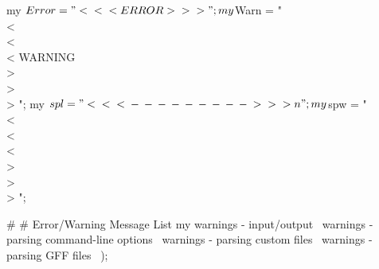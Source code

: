 \documentclass[11pt]{article}
\def\nwendcode{\endtrivlist \endgroup} %
\let\nwdocspar=\par                    %
\begin{document}

\nwenddocs{}\plusendmoddef
my $Error = "\\<\\<\\<  ERROR  \\>\\>\\> ";
my $Warn  = "\\<\\<\\< WARNING \\>\\>\\> ";
my $spl   = "\\<\\<\\<\\-\\-\\-\\-\\-\\-\\-\\-\\-\\>\\>\\>\\n";
my $spw   = "\\<\\<\\<         \\>\\>\\> ";
\nwendcode{}\nwdocspar

\nwenddocs{}\plusendmoddef
#
# Error/Warning Message List
my %
                 \LA{}warnings - input/output~{\nwtagstyle{}}\RA{}
                 \LA{}warnings - parsing command-line options~{\nwtagstyle{}}\RA{}
                 \LA{}warnings - parsing custom files~{\nwtagstyle{}}\RA{}
                 \LA{}warnings - parsing GFF files~{\nwtagstyle{}}\RA{}
                 );
\nwendcode{}\nwdocspar
\end{document}
